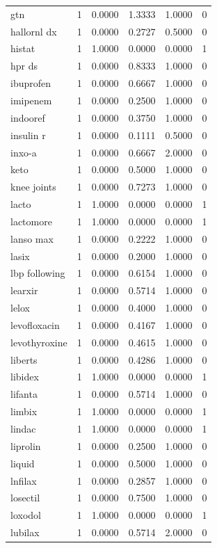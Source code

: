 \begin{longtable}{p{3.0cm}rrrrr}
gtn & 1 & 0.0000 & 1.3333 & 1.0000 & 0 \\
hallornl dx & 1 & 0.0000 & 0.2727 & 0.5000 & 0 \\
histat & 1 & 1.0000 & 0.0000 & 0.0000 & 1 \\
hpr ds & 1 & 0.0000 & 0.8333 & 1.0000 & 0 \\
ibuprofen & 1 & 0.0000 & 0.6667 & 1.0000 & 0 \\
imipenem & 1 & 0.0000 & 0.2500 & 1.0000 & 0 \\
indooref & 1 & 0.0000 & 0.3750 & 1.0000 & 0 \\
insulin r & 1 & 0.0000 & 0.1111 & 0.5000 & 0 \\
inxo-a & 1 & 0.0000 & 0.6667 & 2.0000 & 0 \\
keto & 1 & 0.0000 & 0.5000 & 1.0000 & 0 \\
knee joints & 1 & 0.0000 & 0.7273 & 1.0000 & 0 \\
lacto & 1 & 1.0000 & 0.0000 & 0.0000 & 1 \\
lactomore & 1 & 1.0000 & 0.0000 & 0.0000 & 1 \\
lanso max & 1 & 0.0000 & 0.2222 & 1.0000 & 0 \\
lasix & 1 & 0.0000 & 0.2000 & 1.0000 & 0 \\
lbp following & 1 & 0.0000 & 0.6154 & 1.0000 & 0 \\
learxir & 1 & 0.0000 & 0.5714 & 1.0000 & 0 \\
lelox & 1 & 0.0000 & 0.4000 & 1.0000 & 0 \\
levofloxacin & 1 & 0.0000 & 0.4167 & 1.0000 & 0 \\
levothyroxine & 1 & 0.0000 & 0.4615 & 1.0000 & 0 \\
liberts & 1 & 0.0000 & 0.4286 & 1.0000 & 0 \\
libidex & 1 & 1.0000 & 0.0000 & 0.0000 & 1 \\
lifanta & 1 & 0.0000 & 0.5714 & 1.0000 & 0 \\
limbix & 1 & 1.0000 & 0.0000 & 0.0000 & 1 \\
lindac & 1 & 1.0000 & 0.0000 & 0.0000 & 1 \\
liprolin & 1 & 0.0000 & 0.2500 & 1.0000 & 0 \\
liquid & 1 & 0.0000 & 0.5000 & 1.0000 & 0 \\
lnfilax & 1 & 0.0000 & 0.2857 & 1.0000 & 0 \\
losectil & 1 & 0.0000 & 0.7500 & 1.0000 & 0 \\
loxodol & 1 & 1.0000 & 0.0000 & 0.0000 & 1 \\
lubilax & 1 & 0.0000 & 0.5714 & 2.0000 & 0 \\

\end{longtable}
